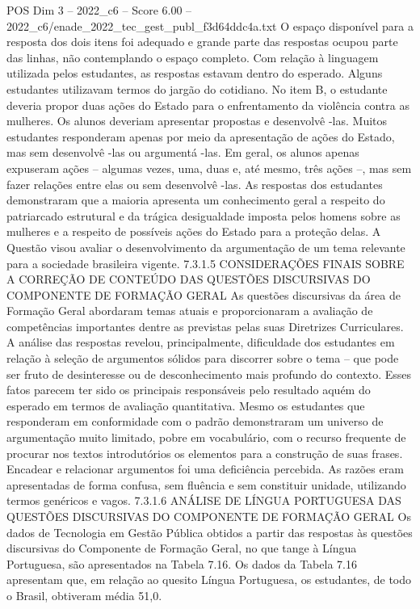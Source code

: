 \begin{textsample}{POS Dim 3 – 2022\_c6 – Score 6.00 – 2022\_c6/enade\_2022\_tec\_gest\_publ\_f3d64ddc4a.txt}
O espaço disponível para a resposta dos dois itens foi adequado e grande parte das respostas ocupou parte das linhas, não contemplando o espaço completo.
Com relação à linguagem utilizada pelos estudantes, as respostas estavam dentro do esperado.
Alguns estudantes utilizavam termos do jargão do cotidiano.
No item B, o estudante deveria propor duas ações do Estado para o enfrentamento da violência contra as mulheres.
Os alunos deveriam apresentar propostas e desenvolvê -las.
Muitos estudantes responderam apenas por meio da apresentação de ações do Estado, mas sem desenvolvê -las ou argumentá -las.
Em geral, os alunos apenas expuseram ações – algumas vezes, uma, duas e, até mesmo, três ações –, mas sem fazer relações entre elas ou sem desenvolvê -las.
As respostas dos estudantes demonstraram que a maioria apresenta um conhecimento geral a respeito do patriarcado estrutural e da trágica desigualdade imposta pelos homens sobre as mulheres e a respeito de possíveis ações do Estado para a proteção delas.
A Questão visou avaliar o desenvolvimento da argumentação de um tema relevante para a sociedade brasileira vigente. 7.3.1.5 CONSIDERAÇÕES FINAIS SOBRE A CORREÇÃO DE CONTEÚDO DAS QUESTÕES DISCURSIVAS DO COMPONENTE DE FORMAÇÃO GERAL As questões discursivas da área de Formação Geral abordaram temas atuais e proporcionaram a avaliação de competências importantes dentre as previstas pelas suas Diretrizes Curriculares.
A análise das respostas revelou, principalmente, dificuldade dos estudantes em relação à seleção de argumentos sólidos para discorrer sobre o tema – que pode ser fruto de desinteresse ou de desconhecimento mais profundo do contexto.
Esses fatos parecem ter sido os principais responsáveis pelo resultado aquém do esperado em termos de avaliação quantitativa.
Mesmo os estudantes que responderam em conformidade com o padrão demonstraram um universo de argumentação muito limitado, pobre em vocabulário, com o recurso frequente de procurar nos textos introdutórios os elementos para a construção de suas frases.
Encadear e relacionar argumentos foi uma deficiência percebida.
As razões eram apresentadas de forma confusa, sem fluência e sem constituir unidade, utilizando termos genéricos e vagos. 7.3.1.6 ANÁLISE DE LÍNGUA PORTUGUESA DAS QUESTÕES DISCURSIVAS DO COMPONENTE DE FORMAÇÃO GERAL Os dados de Tecnologia em Gestão Pública obtidos a partir das respostas às questões discursivas do Componente de Formação Geral, no que tange à Língua Portuguesa, são apresentados na Tabela 7.16.
Os dados da Tabela 7.16 apresentam que, em relação ao quesito Língua Portuguesa, os estudantes, de todo o Brasil, obtiveram média 51,0.

\end{textsample}
